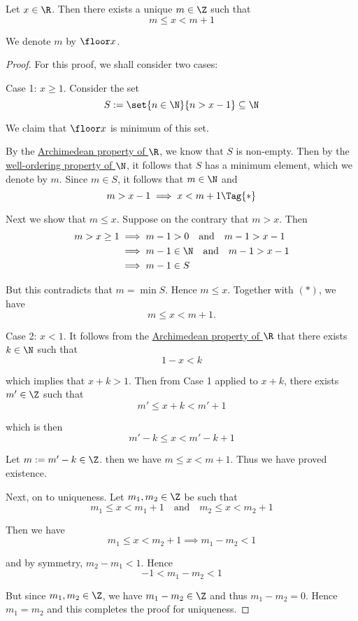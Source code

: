\label{abc7dbd}

Let $x\in\R$. Then there exists a unique $m\in\Z$ such that
$$
  m\leq x<m+1
$$

We denote $m$ by $\floor x$.

\begin{proof}
  For this proof, we shall consider two cases:

  Case 1: $x\geq 1$. Consider the set
  $$
    S:=\set{n\in\N}{n>x-1}\subseteq\N
  $$

  We claim that $\floor x$ is minimum of this set.

  By the \href{fbc2289}{Archimedean property of $\R$}, we know that $S$ is
  non-empty. Then by the \href{cd7c4d1}{well-ordering property of $\N$}, it
  follows that $S$ has a minimum element, which we denote by $m$. Since $m\in
  S$, it follows that $m\in\N$ and
  \begin{equation*}
    m>x-1\implies x<m+1\Tag{*}
  \end{equation*}

  Next we show that $m\leq x$. Suppose on the contrary that $m>x$. Then
  \begin{align*}
    m>x\geq1
     &\implies m-1>0\quad\text{and}\quad m-1>x-1    \\
     &\implies m-1\in\N\quad\text{and}\quad m-1>x-1 \\
     &\implies m-1\in S
  \end{align*}

  But this contradicts that $m=\min S$. Hence $m\leq x$. Together with $(*)$,
  we have
  $$
    m\leq x<m+1.
  $$

  Case 2: $x<1$. It follows from the \href{fbc2289}{Archimedean property of
  $\R$} that there exists $k\in\N$ such that
  $$
    1-x<k
  $$

  which implies that $x+k>1$. Then from Case 1 applied to $x+k$, there exists
  $m'\in\Z$ such that
  $$
    m'\leq x+k<m'+1
  $$

  which is then
  $$
    m'-k\leq x<m'-k+1
  $$

  Let $m:=m'-k\in\Z$. then we have $m\leq x<m+1$. Thus we have proved
  existence.

  Next, on to uniqueness. Let $m_1,m_2\in\Z$ be such that
  $$
    m_1\leq x<m_1+1\quad\text{and}\quad m_2\leq x<m_2+1
  $$

  Then we have
  $$
    m_1\leq x<m_2+1 \implies m_1-m_2<1
  $$

  and by symmetry, $m_2-m_1<1$. Hence
  $$
    -1<m_1-m_2<1
  $$

  But since $m_1,m_2\in\Z$, we have $m_1-m_2\in\Z$ and thus $m_1-m_2=0$. Hence
  $m_1=m_2$ and this completes the proof for uniqueness.
\end{proof}


